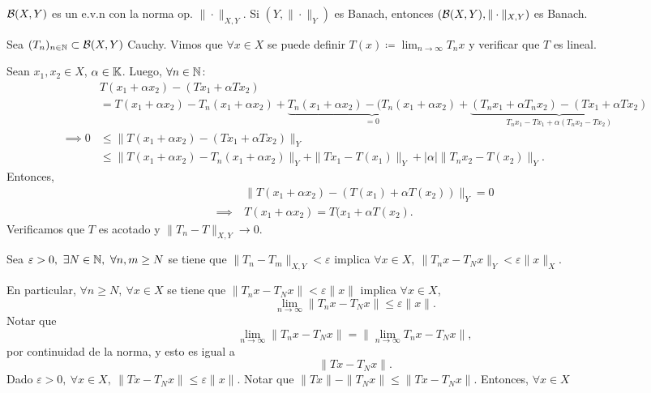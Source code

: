 
$\mathcal{B}(X,Y)$ es un e.v.n con la norma op. $\| \cdot \|_{X,Y}$. Si $(Y, \| \cdot \|_{Y})$ es Banach, entonces $(\mathcal{B}(X,Y), \| \cdot \|_{X,Y})$ es Banach. \par
Sea $(T_{n})_{n \in \mathbb{N}} \subset \mathcal{B}(X,Y)$ Cauchy. Vimos que $\forall x \in X$ se puede definir $T(x) \coloneq \lim_{n \to \infty} T_{n} x$ y verificar que $T$ es lineal. \par
Sean $x_{1},x_{2} \in X$, $\alpha \in \mathbb{K}$. Luego, $\forall n \in \mathbb{N}$:
\begin{align*}
	&T(x_{1} + \alpha x_{2}) - (Tx_{1} + \alpha T x_{2}) \\
	&= T(x_{1} + \alpha x_{2}) - T_{n}(x_{1} + \alpha x_{2}) + \underbrace{T_{n}(x_{1} + \alpha x_{2}) - (T_{n}(x_{1} + \alpha x_{2})}_{= 0} + \underbrace{(T_{n} x_{1} + \alpha T_{n} x_{2}) - (T x_{1} + \alpha T x_{2})}_{T_{n} x_{1} - T x_{1} + \alpha(T_{n} x_{2} - T x_{2})} \\
	\implies 0 &\leq \| T(x_{1} + \alpha x_{2}) - (T x_{1} + \alpha T x_{2}) \|_{Y} \\
	&\leq \| T(x_{1} + \alpha x_{2}) - T_{n}(x_{1} + \alpha x_{2}) \|_{Y} + \| T x_{1} - T (x_{1}) \|_{Y} + |\alpha| \| T_{n} x_{2} - T(x_{2}) \|_{Y}
.\end{align*}
Entonces,
\begin{align*}
	&\| T(x_{1} + \alpha x_{2}) - (T(x_{1}) + \alpha T(x_{2})) \|_{Y} = 0 \\
	\implies \ & T(x_{1} + \alpha x_{2}) = T(x_{1} + \alpha T(x_{2})
.\end{align*}
Verificamos que $T$ es acotado y $\| T_{n} - T \|_{X,Y} \longrightarrow 0$. \par
Sea $\varepsilon > 0,\ \exists N \in \mathbb{N},\ \forall n,m \geq N$ se tiene que $\| T_{n} - T_{m} \|_{X,Y} < \varepsilon$ implica $\forall x \in X,\ \| T_{n} x - T_{N} x \|_{Y} < \varepsilon \| x \|_{X}$. \par
En particular, $\forall n \geq N,\ \forall x \in X$ se tiene que $\| T_{n} x - T_{N} x \| < \varepsilon \| x \|$ implica $\forall x \in X$,
\[ \lim_{n \to \infty} \| T_{n} x - T_{N} x \| \leq \varepsilon \| x \|. \]
Notar que
\[ \lim_{n \to \infty} \| T_{n} x - T_{N} x \| = \| \lim_{n \to \infty} T_{n} x - T_{N} x \|, \]
por continuidad de la norma, y esto es igual a 
\[ \| T x - T_{N} x \|. \]
Dado $\varepsilon > 0,\ \forall x \in X,\ \| T x - T_{N} x \| \leq \varepsilon \| x \|$. Notar que $\| T x \| - \| T_{N} x \| \leq \| T x - T_{N} x \|$. Entonces, $\forall x \in X$
